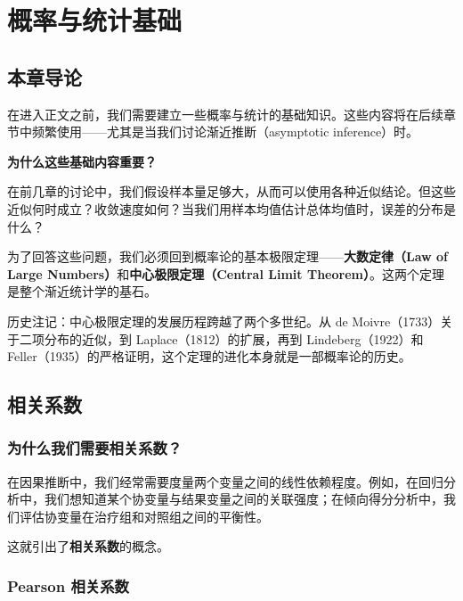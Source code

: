 
\chapter{概率与统计基础}\label{ch:probability}

\section{本章导论}

在进入正文之前，我们需要建立一些概率与统计的基础知识。这些内容将在后续章节中频繁使用——尤其是当我们讨论渐近推断（asymptotic inference）时。

\textbf{为什么这些基础内容重要？}

在前几章的讨论中，我们假设样本量足够大，从而可以使用各种近似结论。但这些近似何时成立？收敛速度如何？当我们用样本均值估计总体均值时，误差的分布是什么？

为了回答这些问题，我们必须回到概率论的基本极限定理——\textbf{大数定律（Law of Large Numbers）}和\textbf{中心极限定理（Central Limit Theorem）}。这两个定理是整个渐近统计学的基石。

历史注记：中心极限定理的发展历程跨越了两个多世纪。从 de Moivre（1733）关于二项分布的近似，到 Laplace（1812）的扩展，再到 Lindeberg（1922）和 Feller（1935）的严格证明，这个定理的进化本身就是一部概率论的历史。

\section{相关系数}\label{sec:correlation}

\subsection{为什么我们需要相关系数？}

在因果推断中，我们经常需要度量两个变量之间的线性依赖程度。例如，在回归分析中，我们想知道某个协变量与结果变量之间的关联强度；在倾向得分分析中，我们评估协变量在治疗组和对照组之间的平衡性。

这就引出了\textbf{相关系数}的概念。

\subsection{Pearson 相关系数}

